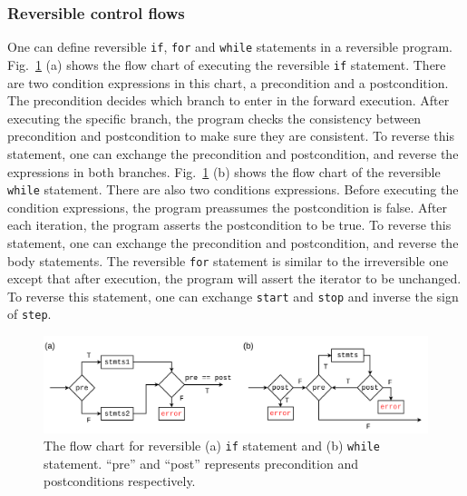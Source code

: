 \documentclass{article}
\newcommand{\<}{\langle}
\renewcommand{\>}{\rangle}
\newcommand{\Fig}[1]{Fig.~\ref{#1}}
\theoremstyle{definition}\newtheorem{definition}{\textit{Definition}}
\begin{document}
\subsubsection{Reversible control flows}
One can define reversible \texttt{if}, \texttt{for} and \texttt{while} statements in a reversible program.
\Fig{fig:controlflow} (a) shows the flow chart of executing the reversible \texttt{if} statement. There are two condition expressions in this chart, a precondition and a postcondition. The precondition decides which branch to enter in the forward execution. After executing the specific branch, the program checks the consistency between precondition and postcondition to make sure they are consistent. To reverse this statement, one can exchange the precondition and postcondition, and reverse the expressions in both branches.
\Fig{fig:controlflow} (b) shows the flow chart of the reversible \texttt{while} statement. There are also two conditions expressions. Before executing the condition expressions, the program preassumes the postcondition is false.
After each iteration, the program asserts the postcondition to be true. To reverse this statement, one can exchange the precondition and postcondition, and reverse the body statements.
The reversible \texttt{for} statement is similar to the irreversible one except that after execution, the program will assert the iterator to be unchanged. To reverse this statement, one can exchange \texttt{start} and \texttt{stop} and inverse the sign of \texttt{step}.
\begin{figure}
    \centerline{\includegraphics[width=0.9\columnwidth,trim={0 0cm 0 0cm},clip]{controlflow_v2.pdf}}
    \caption{The flow chart for reversible (a) \texttt{if} statement and (b) \texttt{while} statement. ``pre'' and ``post'' represents precondition and postconditions respectively.}\label{fig:controlflow}
\end{figure}
\end{document}
